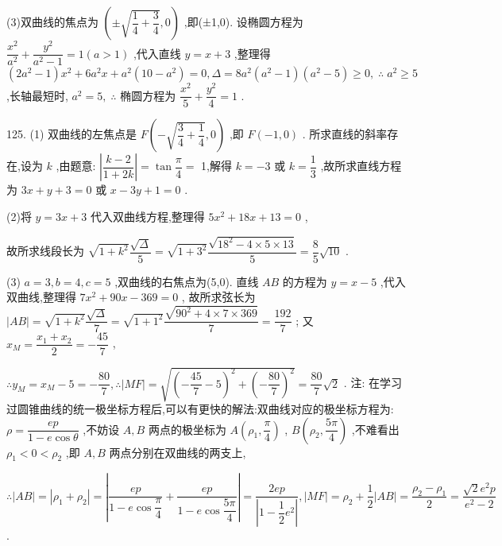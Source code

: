 (3)双曲线的焦点为 $\left( {\pm \sqrt{\dfrac{1}{4} + \dfrac{3}{4}},0}\right)$ ,即(±1,0). 设椭圆方程为 $\dfrac{{x}^{2}}{{a}^{2}} + \dfrac{{y}^{2}}{{a}^{2} - 1} = 1\left( {a > 1}\right)$ ,代入直线 $y = x + 3$ ,整理得 $\left( {2{a}^{2} - 1}\right) {x}^{2} + 6{a}^{2}x + {a}^{2}\left( {{10} - {a}^{2}}\right)  = 0,\Delta  = 8{a}^{2}\left( {{a}^{2} - 1}\right) \left( {{a}^{2} - 5}\right)  \geq  0,\;\therefore \;{a}^{2} \geq  5$ ,长轴最短时, ${a}^{2} = 5,\;\therefore$ 椭圆方程为 $\dfrac{{x}^{2}}{5} + \dfrac{{y}^{2}}{4} = 1$ .

125. (1) 双曲线的左焦点是 $F\left( {-\sqrt{\dfrac{3}{4} + \dfrac{1}{4}},0}\right)$ ,即 $F\left( {-1,0}\right)$ . 所求直线的斜率存在,设为 $k$ ,由题意: $\left| \dfrac{k - 2}{1 + {2k}}\right|  = \tan \dfrac{\pi }{4} =$ 1,解得 $k =  - 3$ 或 $k = \dfrac{1}{3}$ ,故所求直线方程为 ${3x} + y + 3 = 0$ 或 $x - {3y} + 1 = 0$ .

(2)将 $y = {3x} + 3$ 代入双曲线方程,整理得 $5{x}^{2} + {18x} + {13} = 0$ ,

故所求线段长为 $\sqrt{1 + {k}^{2}}\dfrac{\sqrt{\Delta }}{5} = \sqrt{1 + {3}^{2}}\dfrac{\sqrt{{18}^{2} - 4 \times  5 \times  {13}}}{5} = \dfrac{8}{5}\sqrt{10}$ .

(3) $a = 3,b = 4,c = 5$ ,双曲线的右焦点为(5,0). 直线 ${AB}$ 的方程为 $y = x - 5$ ,代入双曲线,整理得 $7{x}^{2} + {90x} - {369} = 0$ , 故所求弦长为 $\left| {AB}\right|  = \sqrt{1 + {k}^{2}}\dfrac{\sqrt{\Delta }}{7} = \sqrt{1 + {1}^{2}}\dfrac{\sqrt{{90}^{2} + 4 \times  7 \times  {369}}}{7} = \dfrac{192}{7}$ ; 又 ${x}_{M} = \dfrac{{x}_{1} + {x}_{2}}{2} =  - \dfrac{45}{7}$ ,

$\therefore {y}_{M} = {x}_{M} - 5 =  - \dfrac{80}{7},\therefore \left| {MF}\right|  = \sqrt{{\left( -\dfrac{45}{7} - 5\right) }^{2} + {\left( -\dfrac{80}{7}\right) }^{2}} = \dfrac{80}{7}\sqrt{2}$ . 注: 在学习过圆锥曲线的统一极坐标方程后,可以有更快的解法:双曲线对应的极坐标方程为: $\rho  = \dfrac{ep}{1 - e\cos \theta }$ ,不妨设 $A,B$ 两点的极坐标为 $A\left( {{\rho }_{1},\dfrac{\pi }{4}}\right)$ , $B\left( {{\rho }_{2},\dfrac{5\pi }{4}}\right)$ ,不难看出 ${\rho }_{1} < 0 < {\rho }_{2}$ ,即 $A,B$ 两点分别在双曲线的两支上,

$\therefore \left| {AB}\right|  = \left| {{\rho }_{1} + {\rho }_{2}}\right|  = \left| {\dfrac{ep}{1 - e\cos \dfrac{\pi }{4}} + \dfrac{ep}{1 - e\cos \dfrac{5\pi }{4}}}\right|  = \dfrac{2ep}{\left| 1 - \dfrac{1}{2}{e}^{2}\right| },\left| {MF}\right|  = {\rho }_{2} + \dfrac{1}{2}\left| {AB}\right|  = \dfrac{{\rho }_{2} - {\rho }_{1}}{2} = \dfrac{\sqrt{2}{e}^{2}p}{{e}^{2} - 2}$ .

